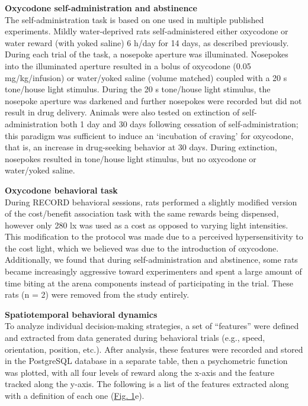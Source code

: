 \documentclass{article}
\begin{document}
\vspace{1em}

\noindent\textbf{Oxycodone self-administration and abstinence}\\
The self-administration task is based on one used in multiple published experiments\cite{moschak2021opposing, moschak2018low, moschak2021sex, moschak2017impulsive, moschak2018neuronal, bossert2020rat, altshuler2021role}. Mildly water-deprived rats self-administered either oxycodone or water reward (with yoked saline) 6 h/day for 14 days, as described previously\cite{friedman2017chronic}. During each trial of the task, a nosepoke aperture was illuminated. Nosepokes into the illuminated aperture resulted in a bolus of oxycodone (0.05 mg/kg/infusion) or water/yoked saline (volume matched) coupled with a 20 s tone/house light stimulus. During the 20 s tone/house light stimulus, the nosepoke aperture was darkened and further nosepokes were recorded but did not result in drug delivery. Animals were also tested on extinction of self-administration both 1 day and 30 days following cessation of self-administration; this paradigm was sufficient to induce an ‘incubation of craving’ for oxycodone, that is, an increase in drug-seeking behavior at 30 days\cite{friedman2020striosomes}. During extinction, nosepokes resulted in tone/house light stimulus, but no oxycodone or water/yoked saline.

\vspace{1em}

\noindent\textbf{Oxycodone behavioral task}\\
During RECORD behavioral sessions, rats performed a slightly modified version of the cost/benefit association task with the same rewards being dispensed, however only 280 lx was used as a cost as opposed to varying light intensities. This modification to the protocol was made due to a perceived hypersensitivity to the cost light, which we believed was due to the introduction of oxycodone. Additionally, we found that during self-administration and abstinence, some rats became increasingly aggressive toward experimenters and spent a large amount of time biting at the arena components instead of participating in the trial. These rats (n = 2) were removed from the study entirely.

\vspace{1em}

\noindent\textbf{Spatiotemporal behavioral dynamics}\\
To analyze individual decision-making strategies, a set of “features” were defined and extracted from data generated during behavioral trials (e.g., speed, orientation, position, etc.). After analysis, these features were recorded and stored in the PostgreSQL database in a separate table, then a psychometric function was plotted, with all four levels of reward along the x-axis and the feature tracked along the y-axis. The following is a list of the features extracted along with a definition of each one (\hyperref[fig:Record_main_1]{Fig. 1}e).
\end{document}
